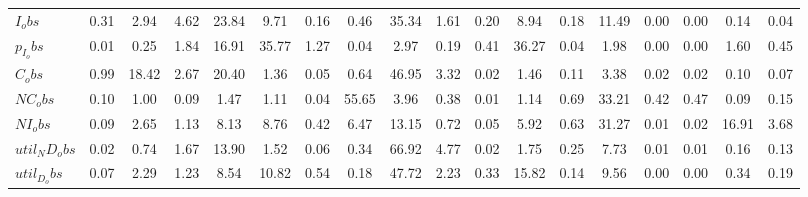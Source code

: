 \begin{center}
\begin{longtable}{lccccccccccccccccc}
$I_obs        $	 & 	            0.31	 & 	            2.94	 & 	            4.62	 & 	           23.84	 & 	            9.71	 & 	            0.16	 & 	            0.46	 & 	           35.34	 & 	            1.61	 & 	            0.20	 & 	            8.94	 & 	            0.18	 & 	           11.49	 & 	            0.00	 & 	            0.00	 & 	            0.14	 & 	            0.04 \\ 
$p_I_obs      $	 & 	            0.01	 & 	            0.25	 & 	            1.84	 & 	           16.91	 & 	           35.77	 & 	            1.27	 & 	            0.04	 & 	            2.97	 & 	            0.19	 & 	            0.41	 & 	           36.27	 & 	            0.04	 & 	            1.98	 & 	            0.00	 & 	            0.00	 & 	            1.60	 & 	            0.45 \\ 
$C_obs        $	 & 	            0.99	 & 	           18.42	 & 	            2.67	 & 	           20.40	 & 	            1.36	 & 	            0.05	 & 	            0.64	 & 	           46.95	 & 	            3.32	 & 	            0.02	 & 	            1.46	 & 	            0.11	 & 	            3.38	 & 	            0.02	 & 	            0.02	 & 	            0.10	 & 	            0.07 \\ 
$NC_obs       $	 & 	            0.10	 & 	            1.00	 & 	            0.09	 & 	            1.47	 & 	            1.11	 & 	            0.04	 & 	           55.65	 & 	            3.96	 & 	            0.38	 & 	            0.01	 & 	            1.14	 & 	            0.69	 & 	           33.21	 & 	            0.42	 & 	            0.47	 & 	            0.09	 & 	            0.15 \\ 
$NI_obs       $	 & 	            0.09	 & 	            2.65	 & 	            1.13	 & 	            8.13	 & 	            8.76	 & 	            0.42	 & 	            6.47	 & 	           13.15	 & 	            0.72	 & 	            0.05	 & 	            5.92	 & 	            0.63	 & 	           31.27	 & 	            0.01	 & 	            0.02	 & 	           16.91	 & 	            3.68 \\ 
$util_ND_obs  $	 & 	            0.02	 & 	            0.74	 & 	            1.67	 & 	           13.90	 & 	            1.52	 & 	            0.06	 & 	            0.34	 & 	           66.92	 & 	            4.77	 & 	            0.02	 & 	            1.75	 & 	            0.25	 & 	            7.73	 & 	            0.01	 & 	            0.01	 & 	            0.16	 & 	            0.13 \\ 
$util_D_obs   $	 & 	            0.07	 & 	            2.29	 & 	            1.23	 & 	            8.54	 & 	           10.82	 & 	            0.54	 & 	            0.18	 & 	           47.72	 & 	            2.23	 & 	            0.33	 & 	           15.82	 & 	            0.14	 & 	            9.56	 & 	            0.00	 & 	            0.00	 & 	            0.34	 & 	            0.19 \\ 

\end{longtable}
\end{center}
